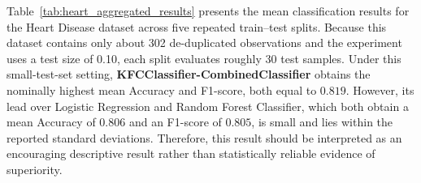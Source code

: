 \begin{table}[H]
    \centering
    \caption{Mean Heart Disease Classification Results}
    \label{tab:heart_aggregated_results}
    \small
\end{table}



\hs Table~\ref{tab:heart_aggregated_results} presents the mean classification results for the Heart Disease dataset across five repeated train--test splits. Because this dataset contains only about 302 de-duplicated observations and the experiment uses a test size of 0.10, each split evaluates roughly 30 test samples. Under this small-test-set setting, \textbf{KFCClassifier-CombinedClassifier} obtains the nominally highest mean Accuracy and F1-score, both equal to $0.819$. However, its lead over Logistic Regression and Random Forest Classifier, which both obtain a mean Accuracy of $0.806$ and an F1-score of $0.805$, is small and lies within the reported standard deviations. Therefore, this result should be interpreted as an encouraging descriptive result rather than statistically reliable evidence of superiority.





